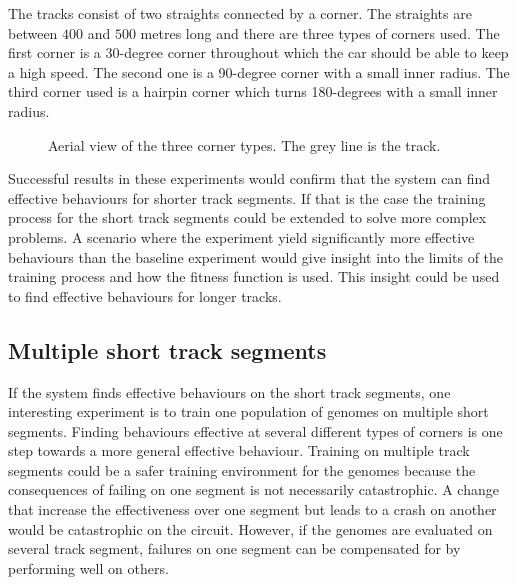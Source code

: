 The tracks consist of two straights connected by a corner. The straights are between $400$ and $500$ metres long and there are three types of corners used. The first corner is a 30-degree corner throughout which the car should be able to keep a high speed. The second one is a 90-degree corner with a small inner radius. The third corner used is a hairpin corner which turns 180-degrees with a small inner radius. 
\begin{figure}[H]
    \centering
    \qquad
    \qquad

    \caption{Aerial view of the three corner types. The grey line is the track.}
\end{figure}

\noindent
Successful results in these experiments would confirm that the system can find effective behaviours for shorter track segments. If that is the case the training process for the short track segments could be extended to solve more complex problems. A scenario where the experiment yield significantly more effective behaviours than the baseline experiment would give insight into the limits of the training process and how the fitness function is used. This insight could be used to find effective behaviours for longer tracks. 

\subsection{Multiple short track segments}

If the system finds effective behaviours on the short track segments, one interesting experiment is to train one population of genomes on multiple short segments. Finding behaviours effective at several different types of corners is one step towards a more general effective behaviour. Training on multiple track segments could be a safer training environment for the genomes because the consequences of failing on one segment is not necessarily catastrophic. A change that increase the effectiveness over one segment but leads to a crash on another would be catastrophic on the circuit. However, if the genomes are evaluated on several track segment, failures on one segment can be compensated for by performing well on others. 

